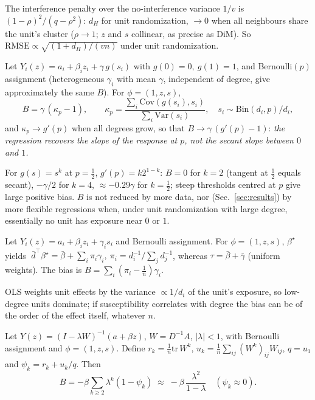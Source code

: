 The interference penalty over the no-interference variance $1/v$ is $(1-\rho)^2/(q-\rho^2)$: $d_H$ for unit randomization, $\to0$ when all neighbours share the unit's cluster ($\rho\to1$; $z$ and $s$ collinear, as precise as DiM). So $\mathrm{RMSE}\propto\sqrt{(1+d_H)/(vn)}$ under unit randomization.

\begin{proposition}\label{prop:extrap}
Let $Y_i(z)=a_i+\beta_iz_i+\gamma\,g(s_i)$ with $g(0)=0,\ g(1)=1$, and Bernoulli$(p)$ assignment (heterogeneous $\gamma_i$ with mean $\gamma$, independent of degree, give approximately the same $B$). For $\phi=(1,z,s)$,
\[
B=\gamma\,(\kappa_p-1),\qquad \kappa_p=\frac{\sum_i\mathrm{Cov}(g(s_i),s_i)}{\sum_i\mathrm{Var}(s_i)},\quad s_i\sim\mathrm{Bin}(d_i,p)/d_i ,
\]
and $\kappa_p\to g'(p)$ when all degrees grow, so that $B\to\gamma\,(g'(p)-1)$: \emph{the regression recovers the slope of the response at $p$, not the secant slope between $0$ and $1$.}
\end{proposition}

For $g(s)=s^k$ at $p=\tfrac12$, $g'(p)=k2^{1-k}$: $B=0$ for $k=2$ (tangent at $\frac12$ equals secant), $-\gamma/2$ for $k=4$, $\approx-0.29\gamma$ for $k=\frac12$; steep thresholds centred at $p$ give large positive bias. $B$ is not reduced by more data, nor (Sec.~\ref{sec:results}) by more flexible regressions when, under unit randomization with large degree, essentially no unit has exposure near $0$ or $1$.

\begin{proposition}\label{prop:wt}
Let $Y_i(z)=a_i+\beta_iz_i+\gamma_is_i$ and Bernoulli assignment. For $\phi=(1,z,s)$, $\beta^\star$ yields
$\;\bar d^\top\beta^\star=\bar\beta+\sum_i\pi_i\gamma_i,\ \pi_i=d_i^{-1}/\sum_jd_j^{-1}$, whereas $\tau=\bar\beta+\bar\gamma$ (uniform weights). The bias is $B=\sum_i(\pi_i-\frac1n)\gamma_i$.
\end{proposition}

OLS weights unit effects by the variance $\propto1/d_i$ of the unit's exposure, so low-degree units dominate; if susceptibility correlates with degree the bias can be of the order of the effect itself, whatever $n$.

\begin{proposition}\label{prop:mh}
Let $Y(z)=(I-\lambda W)^{-1}(a+\beta z)$, $W=D^{-1}A$, $|\lambda|<1$, with Bernoulli assignment and $\phi=(1,z,s)$. Define $r_k=\frac1n\mathrm{tr}\,W^k$, $u_k=\frac1n\sum_{ij}(W^k)_{ij}W_{ij}$, $q=u_1$ and $\psi_k=r_k+u_k/q$. Then
\[ B=-\beta\sum_{k\ge2}\lambda^k(1-\psi_k)\;\approx\;-\beta\,\frac{\lambda^2}{1-\lambda}\quad(\psi_k\approx0).\]
\end{proposition}

